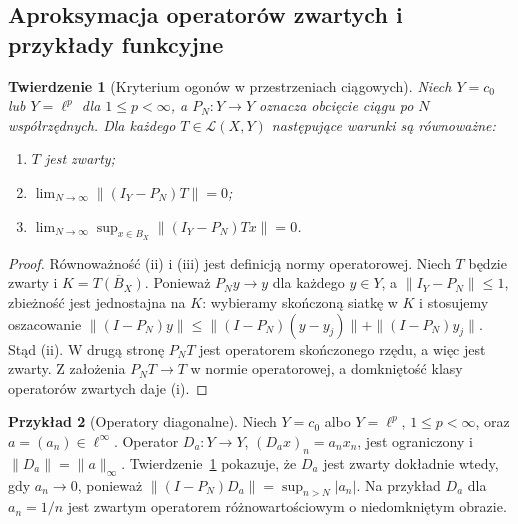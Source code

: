 \documentclass[11pt,a4paper]{article}
\numberwithin{equation}{section}
\theoremstyle{plain}
\newtheorem{twierdzenie}{Twierdzenie}[section]
\theoremstyle{definition}
\newtheorem{przyklad}[twierdzenie]{Przykład}
\theoremstyle{remark}
\begin{document}
\subsection{Aproksymacja operatorów zwartych i przykłady funkcyjne}

\begin{twierdzenie}[Kryterium ogonów w przestrzeniach ciągowych]
\label{thm:tails29}
Niech $Y=c_0$ lub $Y=\ell^p$ dla $1\le p<\infty$,
a $P_N:Y\to Y$ oznacza obcięcie ciągu po $N$ współrzędnych.
Dla każdego $T\in\mathcal L(X,Y)$ następujące warunki są
równoważne:
\begin{enumerate}[label=\textup{(\roman*)}]
\item $T$ jest zwarty;
\item $\lim_{N\to\infty}\|(I_Y-P_N)T\|=0$;
\item $\lim_{N\to\infty}\sup_{x\in B_X}
      \|(I_Y-P_N)Tx\|=0$.
\end{enumerate}
\end{twierdzenie}
\begin{proof}
Równoważność (ii) i (iii) jest definicją normy operatorowej.
Niech $T$ będzie zwarty i $K=\overline{T(B_X)}$.
Ponieważ $P_Ny\to y$ dla każdego $y\in Y$, a
$\|I_Y-P_N\|\le1$, zbieżność jest jednostajna na $K$:
wybieramy skończoną siatkę w $K$ i stosujemy oszacowanie
$\|(I-P_N)y\|\le\|(I-P_N)(y-y_j)\|+
\|(I-P_N)y_j\|$. Stąd (ii).
W drugą stronę $P_NT$ jest operatorem skończonego rzędu,
a więc jest zwarty. Z założenia $P_NT\to T$ w normie
operatorowej, a domkniętość klasy operatorów zwartych
daje (i).
\end{proof}

\begin{przyklad}[Operatory diagonalne]
\label{ex:diagonal29}
Niech $Y=c_0$ albo $Y=\ell^p$, $1\le p<\infty$,
oraz $a=(a_n)\in\ell^\infty$. Operator
$D_a:Y\to Y$, $(D_ax)_n=a_nx_n$, jest ograniczony
i $\|D_a\|=\|a\|_\infty$. Twierdzenie~\ref{thm:tails29}
pokazuje, że $D_a$ jest zwarty dokładnie wtedy, gdy
$a_n\to0$, ponieważ
$\|(I-P_N)D_a\|=\sup_{n>N}|a_n|$.
Na przykład $D_a$ dla $a_n=1/n$ jest zwartym
operatorem różnowartościowym o niedomkniętym obrazie.
\end{przyklad}
\end{document}
